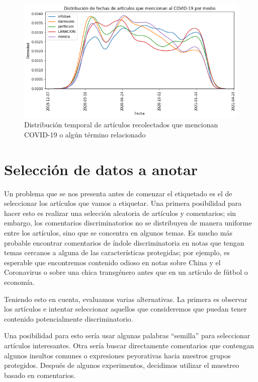 \begin{figure}
    \centering
    \includegraphics[width=\textwidth]{img/fechas_por_medios.png}
    \caption{Distribución temporal de artículos recolectados que mencionan COVID-19 o algún término relacionado}
    \label{fig:fecha_articulos_por_medio_covid}
\end{figure}



\section{Selección de datos a anotar}


Un problema que se nos presenta antes de comenzar el etiquetado es el de seleccionar los artículos que vamos a etiquetar. Una primera posibilidad para hacer esto es realizar una selección aleatoria de artículos y comentarios; sin embargo, los comentarios discriminatorios no se distribuyen de manera uniforme entre los artículos, sino que se concentra en algunos temas. Es mucho más probable encontrar comentarios de índole discriminatoria en notas que tengan temas cercanos a alguna de las características protegidas; por ejemplo, es esperable que encontremos contenido odioso en notas sobre China y el Coronavirus o sobre una chica transgénero antes que en un artículo de fútbol o economía.

Teniendo esto en cuenta, evaluamos varias alternativas. La primera es observar los artículos e intentar seleccionar aquellos que consideremos que puedan tener contenido potencialmente discriminatorio.

Una posibilidad para esto sería usar algunas palabras ``semilla'' para seleccionar artículos interesantes. Otra sería buscar directamente comentarios que contengan algunos insultos comunes o expresiones peyorativas hacia nuestros grupos protegidos. Después de algunos experimentos, decidimos utilizar el muestreo basado en comentarios.

